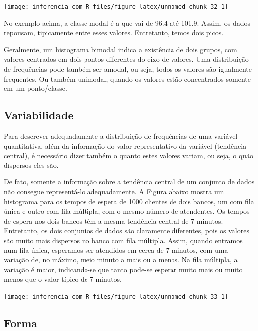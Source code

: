 \documentclass[
]{book}
\begin{document}
\begin{center}\texttt{[image: inferencia\_com\_R\_files/figure-latex/unnamed-chunk-32-1]} \end{center}

No exemplo acima, a classe modal é a que vai de 96.4 até 101.9. Assim, os dados repousam, tipicamente entre esses valores. Entretanto, temos dois picos.

Geralmente, um histograma bimodal indica a existência de dois grupos, com valores centrados em dois pontos diferentes do eixo de valores. Uma distribuição de frequências pode também ser amodal, ou seja, todos os valores são igualmente frequentes. Ou também unimodal, quando os valores estão concentrados somente em um ponto/classe.

\hypertarget{variabilidade}{%
\subsection{Variabilidade}\label{variabilidade}}

Para descrever adequadamente a distribuição de frequências de uma variável quantitativa, além da informação do valor representativo da variável (tendência central), é necessário dizer também o quanto estes valores variam, ou seja, o quão dispersos eles são.

De fato, somente a informação sobre a tendência central de um conjunto de dados não consegue representá-lo adequadamente. A Figura abaixo mostra um histograma para os tempos de espera de 1000 clientes de dois bancos, um com fila única e outro com fila múltipla, com o mesmo número de atendentes. Os tempos de espera nos dois bancos têm a mesma tendência central de 7 minutos. Entretanto, os dois conjuntos de dados são claramente diferentes, pois os valores são muito mais dispersos no banco com fila múltipla. Assim, quando entramos num fila única, esperamos ser atendidos em cerca de 7 minutos, com uma variação de, no máximo, meio minuto a mais ou a menos. Na fila múltipla, a variação é maior, indicando-se que tanto pode-se esperar muito mais ou muito menos que o valor típico de 7 minutos.

\begin{center}\texttt{[image: inferencia\_com\_R\_files/figure-latex/unnamed-chunk-33-1]} \end{center}

\hypertarget{forma}{%
\subsection{Forma}\label{forma}}
\end{document}
